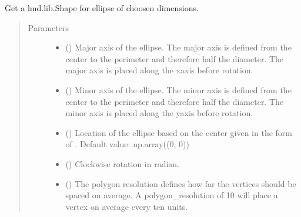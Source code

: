 \documentclass[a4paper,10pt,english,openany,oneside]{sphinxmanual}
\begin{document}
\begin{fulllineitems}
\label{\detokenize{pages/modules:lmd.tools.ellipse}}
\sphinxAtStartPar
Get a lmd.lib.Shape for ellipse of choosen dimensions.
\begin{quote}\begin{description}
\item[{Parameters}] \leavevmode\begin{itemize}
\item {} 
\sphinxAtStartPar
{} () \textendash{} Major axis of the ellipse. The major axis is defined from the center to the perimeter and therefore half the diameter. The major axis is placed along the x\sphinxhyphen{}axis before rotation.

\item {} 
\sphinxAtStartPar
{} () \textendash{} Minor axis of the ellipse. The minor axis is defined from the center to the perimeter and therefore half the diameter. The minor axis is placed along the y\sphinxhyphen{}axis before rotation.

\item {} 
\sphinxAtStartPar
{} () \textendash{} Location of the ellipse based on the center given in the form of . Default value: np.array((0, 0))

\item {} 
\sphinxAtStartPar
{} () \textendash{} Clockwise rotation in radian.

\item {} 
\sphinxAtStartPar
{} () \textendash{} The polygon resolution defines how far the vertices should be spaced on average. A polygon\_resolution of 10 will place a vertex on average every ten units.


\end{itemize}
\end{description}
\end{quote}
\end{fulllineitems}
\end{document}
